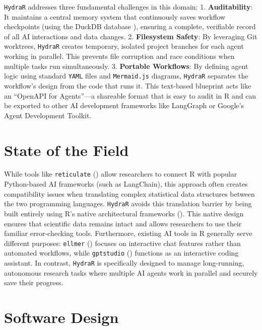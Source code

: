 \documentclass[
]{article}
\begin{document}
\texttt{HydraR} addresses three fundamental challenges in this domain:
1. \textbf{Auditability}: It maintains a central memory system that continuously saves workflow checkpoints (using the DuckDB database ), ensuring a complete, verifiable record of all AI interactions and data changes. 2. \textbf{Filesystem Safety}: By leveraging Git worktrees, \texttt{HydraR} creates temporary, isolated project branches for each agent working in parallel. This prevents file corruption and race conditions when multiple tasks run simultaneously. 3. \textbf{Portable Workflows}: By defining agent logic using standard \texttt{YAML} files and \texttt{Mermaid.js} diagrams, \texttt{HydraR} separates the workflow's design from the code that runs it. This text-based blueprint acts like an ``OpenAPI for Agents''---a shareable format that is easy to audit in R and can be exported to other AI development frameworks like LangGraph or Google's Agent Development Toolkit.

\section{State of the Field}\label{state-of-the-field}

While tools like \texttt{reticulate} () allow researchers to connect R with popular Python-based AI frameworks (such as LangChain), this approach often creates compatibility issues when translating complex statistical data structures between the two programming languages. \texttt{HydraR} avoids this translation barrier by being built entirely using R's native architectural frameworks (). This native design ensures that scientific data remains intact and allows researchers to use their familiar error-checking tools. Furthermore, existing AI tools in R generally serve different purposes: \texttt{ellmer} () focuses on interactive chat features rather than automated workflows, while \texttt{gptstudio} () functions as an interactive coding assistant. In contrast, \texttt{HydraR} is specifically designed to manage long-running, autonomous research tasks where multiple AI agents work in parallel and securely save their progress.

\section{Software Design}\label{software-design}
\end{document}
